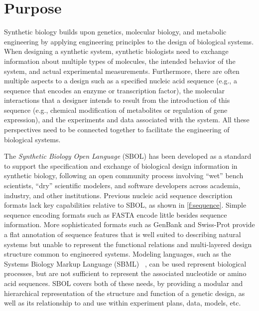 \section{Purpose}

Synthetic biology builds upon genetics, molecular biology, and metabolic engineering by applying engineering principles to the design of biological systems.
When designing a synthetic system, synthetic biologists need to exchange information about multiple types of molecules, the intended behavior of the system, and actual experimental measurements.
Furthermore, there are often multiple aspects to a design such as a specified nucleic acid sequence (e.g., a sequence that encodes an enzyme or transcription factor), the molecular interactions that a designer intends to result from the introduction of this sequence (e.g., chemical modification of metabolites or regulation of gene expression), and the experiments and data associated with the system. All these perspectives need to be connected together to facilitate the engineering of biological systems.

The \emph{Synthetic Biology Open Language} (SBOL) has been developed as a standard to support the specification and exchange of biological design information in synthetic biology,
following an open community process involving ``wet'' bench scientists, ``dry'' scientific modelers, and software developers across academia, industry, and other institutions.
Previous nucleic acid sequence description formats lack key capabilities relative to SBOL, as shown in \ref{f:sequence}.
Simple sequence encoding formats such as FASTA encode little besides sequence information.
More sophisticated formats such as GenBank and Swiss-Prot provide a flat annotation of sequence features that is well suited to describing natural systems but unable to represent the functional relations and multi-layered design structure common to engineered systems.
Modeling languages, such as the Systems Biology Markup Language (SBML) ~\cite{SBML}, can be used represent biological processes, but are not sufficient to represent the associated nucleotide or amino acid sequences.
SBOL covers both of these needs, by providing a modular and hierarchical representation of the structure and function of a genetic design, as well as its relationship to and use within experiment plans, data, models, etc.

